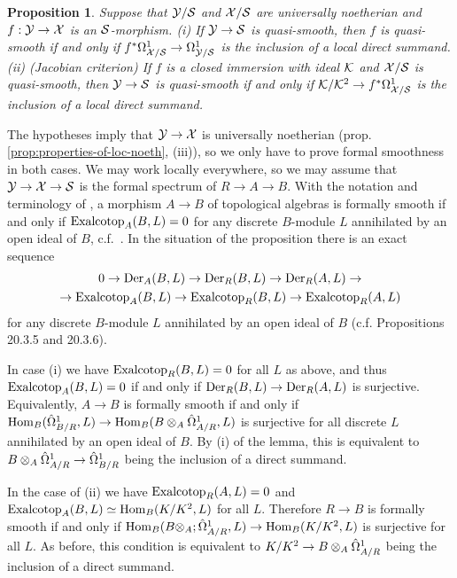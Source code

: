 \documentclass{article}
\theoremstyle{change}
\newtheorem{prop}[subsubsection]{Proposition}
\numberwithin{equation}{subsubsection}
\newcommand{\demobox}{\vrule height6pt width6pt depth0pt}
\newenvironment{demo}{\noindent{\it Proof.}}
{{\unskip\nobreak\hfil\qquad
\demobox\parfillskip=0pt\par}
\medskip}
\begin{document}
\begin{prop}\label{prop:smoothness-criteria}
  Suppose that ${\cal Y}/{\cal S}$ and ${\cal X}/{\cal S}$ are universally noetherian and
  $f:{\cal Y}\to{\cal X}$ is an ${\cal S}$-morphism. (i) If ${\cal Y}\to{\cal S}$ is quasi-smooth,
  then $f$ is quasi-smooth if and only if
  $f^*\Omega^1_{{\cal X}/{\cal S}}\to\Omega^1_{{\cal Y}/{\cal S}}$ is the inclusion of a local
  direct summand. (ii) (Jacobian criterion) If $f$ is a closed
  immersion with ideal ${\cal K}$ and ${\cal X}/{\cal S}$ is quasi-smooth, then
  ${\cal Y}\to{\cal S}$ is quasi-smooth if and only if
  ${\cal K}/{\cal K}^2\to f^*\Omega^1_{{\cal X}/{\cal S}}$ is the inclusion of a local direct
  summand.
\end{prop}
\begin{demo}
  The hypotheses imply that ${\cal Y}\to{\cal X}$ is universally noetherian
  (prop. \ref{prop:properties-of-loc-noeth}, (iii)), so we only have
  to prove formal smoothness in both cases. We may work locally
  everywhere, so we may assume that ${\cal Y}\to{\cal X}\to{\cal S}$ is the formal
  spectrum of $R\to A\to B$.  With the notation and terminology of
  \cite[$0_{IV}$ \S20]{EGA}, a morphism $A\to B$ of topological
  algebras is formally smooth if and only if ${\operatorname{Exalcotop}}_A(B,L)=0$ for
  any discrete $B$-module $L$ annihilated by an open ideal of $B$,
  c.f.\ \cite[$0_{IV}$ 19.4.4]{EGA}. In the situation of the
  proposition there is an exact sequence
  \begin{multline*}
    0\to{\operatorname{Der}}_A(B,L)\to{\operatorname{Der}}_R(B,L)\to{\operatorname{Der}}_R(A,L)\to\\
    \to{\operatorname{Exalcotop}}_A(B,L)\to{\operatorname{Exalcotop}}_R(B,L)\to{\operatorname{Exalcotop}}_R(A,L)
  \end{multline*}
  for any discrete $B$-module $L$ annihilated by an open ideal of $B$
  (c.f. \cite[$0_{IV}$]{EGA} Propositions 20.3.5 and 20.3.6).

  In case (i) we have ${\operatorname{Exalcotop}}_R(B,L)=0$ for all $L$ as above, and
  thus ${\operatorname{Exalcotop}}_A(B,L)=0$ if and only if
  ${\operatorname{Der}}_R(B,L)\to{\operatorname{Der}}_R(A,L)$ is surjective. Equivalently, $A\to B$ is
  formally smooth if and only if
  ${\operatorname{Hom}}_B(\hat\Omega^1_{B/R},L)\to{\operatorname{Hom}}_B(B\otimes_A\hat\Omega^1_{A/R},L)$ is
  surjective for all discrete $L$ annihilated by an open ideal of
  $B$. By (i) of the lemma, this is equivalent to
  $B\otimes_A\hat\Omega^1_{A/R}\to\hat\Omega^1_{B/R}$ being the inclusion of a
  direct summand.

  In the case of (ii) we have ${\operatorname{Exalcotop}}_R(A,L)=0$ and
  ${\operatorname{Exalcotop}}_A(B,L)\simeq{\operatorname{Hom}}_B(K/K^2,L)$ for all $L$. Therefore
  $R\to B$ is formally smooth if and only if
  ${\operatorname{Hom}}_B(B\otimes_A;\hat\Omega^1_{A/R},L)\to{\operatorname{Hom}}_B(K/K^2,L)$ is surjective
  for all $L$. As before, this condition is equivalent to
  $K/K^2\to B\otimes_A\hat\Omega^1_{A/R}$ being the inclusion of a direct
  summand.
\end{demo}
\end{document}

